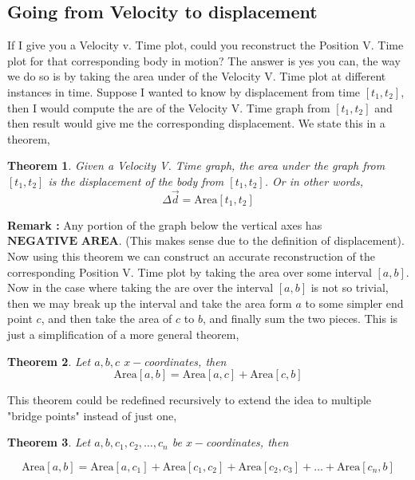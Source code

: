 \documentclass[12pt]{article}
\newcommand{\tx}[1]{\text{#1}}
\theoremstyle{break}
\newtheorem{thm}{Theorem}[subsection]
\begin{document}
\newpage
\subsection{Going from Velocity to displacement}
If I give you a Velocity v. Time plot, could you reconstruct the Position V. Time plot for that corresponding body in motion? The answer is yes you can, the way we do so is by taking the area under of the Velocity V. Time plot at different instances in time. Suppose I wanted to know by displacement from time $[t_1,t_2]$, then I would compute the are of the Velocity V. Time graph from $[t_1,t_2]$ and then result would give me the corresponding displacement. We state this in a theorem,
\begin{thm}
Given a Velocity V. Time graph, the area under the graph from $[t_1,t_2]$ is the displacement of the body from $[t_1,t_2]$. Or in other words,
$$ \Delta \vec d = \tx{Area}[t_1,t_2]$$
\end{thm}
\textbf{Remark :} Any portion of the graph below the vertical axes has $\textbf{NEGATIVE AREA}$. (This makes sense due to the definition of displacement).\\


Now using this theorem we can construct an accurate reconstruction of the corresponding Position V. Time plot by taking the area over some interval $[a,b]$. Now in the case where taking the are over the interval $[a,b]$ is not so trivial, then we may break up the interval and take the area form $a$ to some simpler end point $c$, and then take the area of $c$ to $b$, and finally sum the two pieces. This is just a simplification of a more general theorem,

\begin{thm}
    Let $a,b,c$ $x-$coordinates, then
    $$\tx{Area}[a,b]  =  \tx{Area}[a,c] + \tx{Area}[c,b]$$
\end{thm}
This theorem could be redefined recursively to extend the idea to multiple "bridge points" instead of just one,
\begin{thm}
    Let $a,b, c_1,c_2,\dots,c_n$ be $x-$coordinates, then 

    $$\tx{Area}[a,b]  =  \tx{Area}[a,c_1] + \tx{Area}[c_1,c_2] + \tx{Area}[c_2,c_3] + \dots + \tx{Area}[c_{n},b]$$ 
\end{thm}
\end{document}
